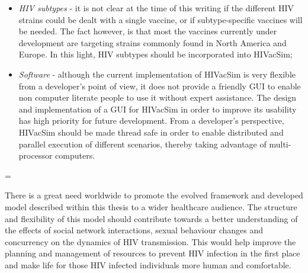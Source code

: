 \begin{itemize}
    \item \emph{HIV subtypes} - it is not clear at the time of this writing if the
    different HIV strains could be dealt with a single vaccine, or if subtype-specific
    vaccines will be needed. The fact however, is that most the vaccines currently under
    development are targeting strains commonly found in North America and Europe. In this
    light, HIV subtypes should be incorporated into HIVacSim;

    \item \emph{Software} - although the current implementation of HIVacSim is very
    flexible from a developer's point of view, it does not provide a friendly GUI to enable
    non computer literate people to use it without expert assistance. The design and
    implementation of a GUI for HIVacSim in order to improve its usability has high
    priority for future development. From a developer's perspective, HIVacSim should be
    made thread safe in order to enable distributed and parallel execution of different
    scenarios, thereby taking advantage of multi-processor computers.
\end{itemize}
\parskip=\baselineskip

There is a great need worldwide to promote the evolved framework and developed model
described within this thesis to a wider healthcare audience. The structure and
flexibility of this model should contribute towards a better understanding of the effects
of social network interactions, sexual behaviour changes and concurrency on the dynamics
of HIV transmission. This would help improve the planning and management of resources to
prevent HIV infection in the first place and make life for those HIV infected individuals
more human and comfortable.
